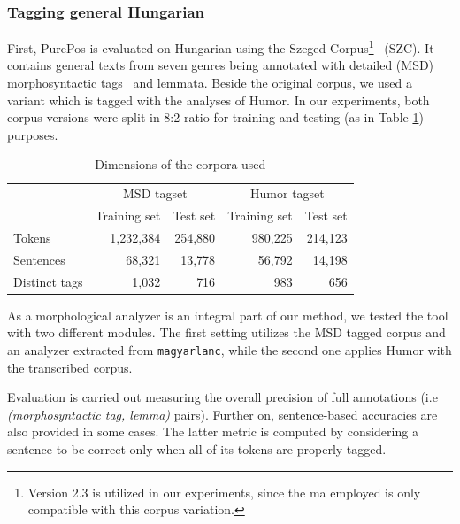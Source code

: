 
\subsubsection{Tagging general Hungarian}

First, PurePos is evaluated on Hungarian using the Szeged Corpus\footnote{Version 2.3 is utilized in our experiments, since the \acrshort{ma} employed is only compatible with this corpus variation.}~\cite{Csendes2004} (SZC). 
It contains general texts from seven genres being annotated with detailed (MSD) morphosyntactic tags~\cite{Erjavec2012} and lemmata.
Beside the original corpus, we used a variant which is tagged with the analyses of Humor. 
In our experiments, both corpus versions were split in 8:2 ratio for training and testing (as in Table \ref{tab:szeged-corpus}) purposes. 

\begin{table}[H]
\centering
\caption{Dimensions of the corpora used}
\begin{tabular}{l r r r r}
  \hline
  & \multicolumn{2}{c}{MSD tagset} & \multicolumn{2}{c}{Humor tagset} \\
  &  Training set &  Test set &  Training set &  Test set  \\
  \hline
  Tokens &  1,232,384 &  254,880 &  980,225 &  214,123 \\
  Sentences &  68,321 &  13,778 &  56,792 &  14,198 \\
  Distinct tags &  1,032 &  716 &  983 &  656 \\
  \hline
\end{tabular}
\label{tab:szeged-corpus}
\end{table}

As a morphological analyzer is an integral part of our method, we tested the tool with two different modules. 
The first setting utilizes the MSD tagged corpus and an analyzer extracted from \texttt{magyarlanc}, while the second one applies Humor with the transcribed corpus.

Evaluation is carried out measuring the overall precision of full annotations (i.e \emph{(morphosyntactic tag, lemma)} pairs). 
Further on, sentence-based accuracies are also provided in some cases. 
The latter metric is computed by considering a sentence to be correct only when all of its tokens are properly tagged. 

